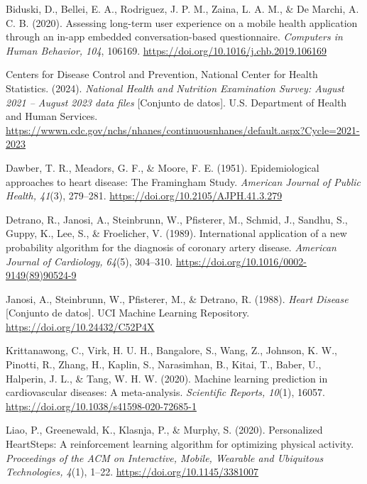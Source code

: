 \documentclass[12pt,letterpaper]{article}
\begin{document}
\begin{enumerate}[label={[\arabic*]}, leftmargin=2.2em]

\item Biduski, D., Bellei, E. A., Rodriguez, J. P. M., Zaina, L. A. M., \& De
Marchi, A. C. B. (2020). Assessing long-term user experience on a mobile health
application through an in-app embedded conversation-based questionnaire.
\textit{Computers in Human Behavior, 104}, 106169.
\url{https://doi.org/10.1016/j.chb.2019.106169}

\item Centers for Disease Control and Prevention, National Center for Health
Statistics. (2024). \textit{National Health and Nutrition Examination Survey:
August 2021 -- August 2023 data files} [Conjunto de datos]. U.S. Department of
Health and Human Services.
\url{https://wwwn.cdc.gov/nchs/nhanes/continuousnhanes/default.aspx?Cycle=2021-2023}

\item Dawber, T. R., Meadors, G. F., \& Moore, F. E. (1951). Epidemiological
approaches to heart disease: The Framingham Study. \textit{American Journal of
Public Health, 41}(3), 279--281. \url{https://doi.org/10.2105/AJPH.41.3.279}

\item Detrano, R., Janosi, A., Steinbrunn, W., Pfisterer, M., Schmid, J.,
Sandhu, S., Guppy, K., Lee, S., \& Froelicher, V. (1989). International
application of a new probability algorithm for the diagnosis of coronary artery
disease. \textit{American Journal of Cardiology, 64}(5), 304--310.
\url{https://doi.org/10.1016/0002-9149(89)90524-9}

\item Janosi, A., Steinbrunn, W., Pfisterer, M., \& Detrano, R. (1988).
\textit{Heart Disease} [Conjunto de datos]. UCI Machine Learning Repository.
\url{https://doi.org/10.24432/C52P4X}

\item Krittanawong, C., Virk, H. U. H., Bangalore, S., Wang, Z., Johnson, K. W.,
Pinotti, R., Zhang, H., Kaplin, S., Narasimhan, B., Kitai, T., Baber, U.,
Halperin, J. L., \& Tang, W. H. W. (2020). Machine learning prediction in
cardiovascular diseases: A meta-analysis. \textit{Scientific Reports, 10}(1),
16057. \url{https://doi.org/10.1038/s41598-020-72685-1}

\item Liao, P., Greenewald, K., Klasnja, P., \& Murphy, S. (2020). Personalized
HeartSteps: A reinforcement learning algorithm for optimizing physical activity.
\textit{Proceedings of the ACM on Interactive, Mobile, Wearable and Ubiquitous
Technologies, 4}(1), 1--22. \url{https://doi.org/10.1145/3381007}


\end{enumerate}
\end{document}
